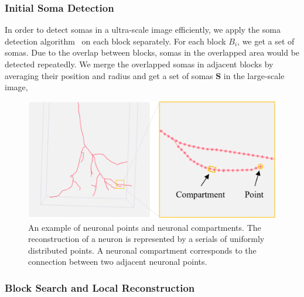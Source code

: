 \subsubsection{Initial Soma Detection}
\label{sec:soma}

In order to detect somas in a ultra-scale image efficiently, we apply the soma detection algorithm~\cite{Quan2013} on each block separately. 
%
For each block $B_{i}$, we get a set of somas.
Due to the overlap between blocks, somas in the overlapped area would be detected repeatedly.
We merge the overlapped somas in adjacent blocks by averaging their position and radius and get a set of somas $\mathbf{S} $ in the large-scale image, 

\begin{figure}[t]
	\centering
	\includegraphics[width=1\columnwidth]{./Illustrations/neuronal_points.png}
	\caption{An example of neuronal points and neuronal compartments. The reconstruction of a neuron is represented by a serials of uniformly distributed points. A neuronal compartment corresponds to the connection between two adjacent neuronal points.}
	\label{fig:neuronal_points}
\end{figure}

\subsubsection{Block Search and Local Reconstruction}
\label{sec:trace}

